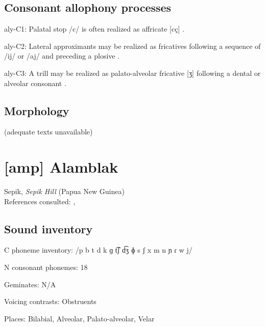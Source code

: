 {\subsection*{Consonant allophony processes}
\begin{appendixdesc}

\item[aly-C1:] Palatal stop /c/ is often realized as affricate [cç] \citep[21]{Yallop1977}.

\item[aly-C2:] Lateral approximants may be realized as fricatives following a sequence of /ij/ or /aj/ and preceding a plosive \citep[19]{Yallop1977}.

\item[aly-C3:] A trill may be realized as palato-alveolar fricative [ʒ] following a dental or alveolar consonant \citep[19]{Yallop1977}.
\end{appendixdesc}
\subsection*{Morphology}

(adequate texts unavailable)

\section*{[amp] Alamblak}  %
Sepik, \textit{Sepik Hill} (Papua New Guinea)\medskip\\
References consulted: \citet{Bruce1984}, \citet{EdmistonEdmiston2003}

\subsection*{Sound inventory}
\begin{appendixdesc}

\item[C phoneme inventory:] /p b t d k ɡ t͡ʃ d͡ʒ ɸ s ʃ x m n ɲ ɾ w j/

\item[N consonant phonemes:] 18

\item[Geminates:] N/A

\item[Voicing contrasts:] Obstruents

\item[Places:] Bilabial, Alveolar, Palato-alveolar, Velar


\end{appendixdesc}}
